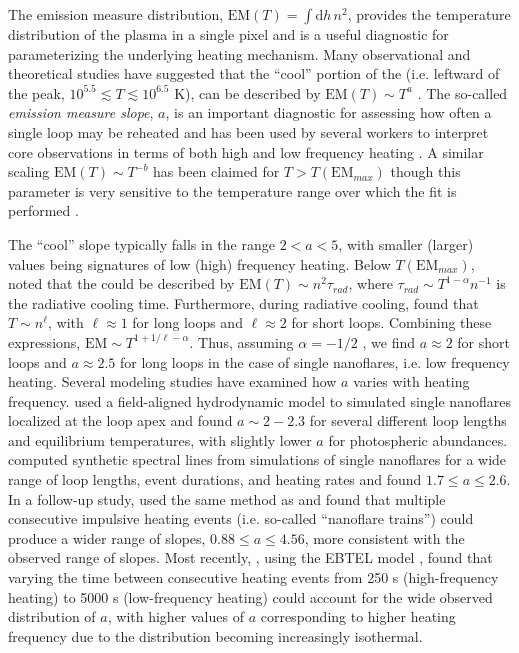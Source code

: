 The emission measure distribution, $\mathrm{EM}(T)=\int\mathrm{d}h\,n^2$, provides the temperature distribution of the plasma in a single pixel and is a useful diagnostic for parameterizing the underlying heating mechanism. Many observational and theoretical studies have suggested that the ``cool'' portion of the \dem{} (i.e. leftward of the peak, $10^{5.5}\lesssim T\lesssim10^{6.5}$ K), can be described by $\mathrm{EM}(T)\sim T^a$ \citep{jordan_structure_1976,cargill_implications_1994,cargill_nanoflare_2004,warren_systematic_2012}. The so-called \textit{emission measure slope}, $a$, is an important diagnostic for assessing how often a single loop may be reheated and has been used by several workers to interpret \AR{} core observations in terms of both high and low frequency heating \citet[see Table 3 of][and references therin]{bradshaw_diagnosing_2012}. A similar scaling $\mathrm{EM}(T)\sim T^{-b}$ has been claimed for $T>T(\mathrm{EM}_{max})$ though this parameter is very sensitive to the temperature range over which the fit is performed \citep[see section 3.3.1 of][]{barnes_inference_2016-1}.

The ``cool'' \dem{} slope typically falls in the range $2<a<5$, with smaller (larger) values being signatures of low (high) frequency heating. Below $T(\mathrm{EM}_{max})$, \citet{cargill_implications_1994} noted that the \dem{} could be described by $\mathrm{EM}(T)\sim n^2\tau_{rad}$, where $\tau_{rad}\sim T^{1-\alpha}n^{-1}$ is the radiative cooling time. Furthermore, during radiative cooling, \citet{bradshaw_cooling_2010} found that $T\sim n^{\ell}$, with $\ell\approx1$ for long loops and $\ell\approx2$ for short loops. Combining these expressions, $\mathrm{EM}\sim T^{1+1/\ell-\alpha}$. Thus, assuming $\alpha=-1/2$ \citep[i.e. using the radiative losses of][]{rosner_dynamics_1978}, we find $a\approx2$ for short loops and $a\approx2.5$ for long loops in the case of single nanoflares, i.e. low frequency heating. Several modeling studies have examined how $a$ varies with heating frequency. \citet{mulu-moore_can_2011} used a field-aligned hydrodynamic model to simulated single nanoflares localized at the loop apex and found $a\sim2-2.3$ for several different loop lengths and equilibrium temperatures, with slightly lower $a$ for photospheric abundances. \citet{bradshaw_diagnosing_2012} computed synthetic spectral lines from simulations of single nanoflares for a wide range of loop lengths, event durations, and heating rates and found $1.7\le a\le2.6$. In a follow-up study, \citet{reep_diagnosing_2013} used the same method as \citeauthor{bradshaw_diagnosing_2012} and found that multiple consecutive impulsive heating events (i.e. so-called ``nanoflare trains'') could produce a wider range of slopes, $0.88\le a\le4.56$, more consistent with the observed range of slopes. Most recently, \citet{cargill_active_2014}, using the EBTEL model \citep{klimchuk_highly_2008,cargill_enthalpy-based_2012,cargill_enthalpy-based_2012-1}, found that varying the time between consecutive heating events from 250 s (high-frequency heating) to 5000 s (low-frequency heating) could account for the wide observed distribution of $a$, with higher values of $a$ corresponding to higher heating frequency due to the \dem{} distribution becoming increasingly isothermal. 

